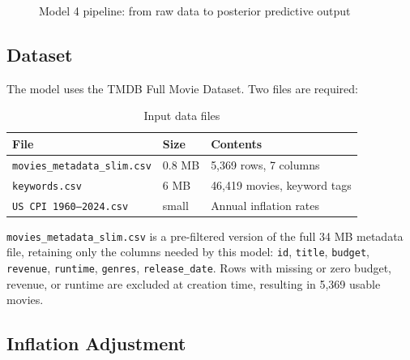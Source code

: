 \documentclass[12pt,a4paper]{article}
\begin{document}
\begin{figure}[H]
\caption{Model 4 pipeline: from raw data to posterior predictive output}
\end{figure}

\subsection{Dataset}

The model uses the TMDB Full Movie Dataset. Two files are required:

\begin{table}[H]
\centering
\begin{tabular}{lll}
\toprule
\textbf{File} & \textbf{Size} & \textbf{Contents} \\
\midrule
\texttt{movies\_metadata\_slim.csv} & 0.8 MB & 5,369 rows, 7 columns \\
\texttt{keywords.csv}               & 6 MB   & 46,419 movies, keyword tags \\
\texttt{US CPI 1960--2024.csv}      & small  & Annual inflation rates \\
\bottomrule
\end{tabular}
\caption{Input data files}
\end{table}

\texttt{movies\_metadata\_slim.csv} is a pre-filtered version of the full 34 MB
metadata file, retaining only the columns needed by this model:
\texttt{id}, \texttt{title}, \texttt{budget}, \texttt{revenue},
\texttt{runtime}, \texttt{genres}, \texttt{release\_date}.
Rows with missing or zero budget, revenue, or runtime are excluded at
creation time, resulting in 5,369 usable movies.

\subsection{Inflation Adjustment}
\end{document}
